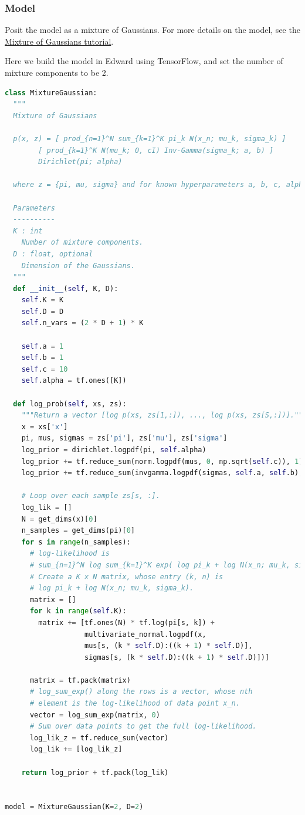 \subsubsection{Model}

Posit the model as a mixture of Gaussians. For more details on the
model, see the
\href{tut_mixture_gaussian.html}
{Mixture of Gaussians tutorial}.

Here we build the model in Edward using TensorFlow, and set the number
of mixture components to be 2.
\begin{lstlisting}[language=Python]
class MixtureGaussian:
  """
  Mixture of Gaussians

  p(x, z) = [ prod_{n=1}^N sum_{k=1}^K pi_k N(x_n; mu_k, sigma_k) ]
        [ prod_{k=1}^K N(mu_k; 0, cI) Inv-Gamma(sigma_k; a, b) ]
        Dirichlet(pi; alpha)

  where z = {pi, mu, sigma} and for known hyperparameters a, b, c, alpha.

  Parameters
  ----------
  K : int
    Number of mixture components.
  D : float, optional
    Dimension of the Gaussians.
  """
  def __init__(self, K, D):
    self.K = K
    self.D = D
    self.n_vars = (2 * D + 1) * K

    self.a = 1
    self.b = 1
    self.c = 10
    self.alpha = tf.ones([K])

  def log_prob(self, xs, zs):
    """Return a vector [log p(xs, zs[1,:]), ..., log p(xs, zs[S,:])]."""
    x = xs['x']
    pi, mus, sigmas = zs['pi'], zs['mu'], zs['sigma']
    log_prior = dirichlet.logpdf(pi, self.alpha)
    log_prior += tf.reduce_sum(norm.logpdf(mus, 0, np.sqrt(self.c)), 1)
    log_prior += tf.reduce_sum(invgamma.logpdf(sigmas, self.a, self.b), 1)

    # Loop over each sample zs[s, :].
    log_lik = []
    N = get_dims(x)[0]
    n_samples = get_dims(pi)[0]
    for s in range(n_samples):
      # log-likelihood is
      # sum_{n=1}^N log sum_{k=1}^K exp( log pi_k + log N(x_n; mu_k, sigma_k) )
      # Create a K x N matrix, whose entry (k, n) is
      # log pi_k + log N(x_n; mu_k, sigma_k).
      matrix = []
      for k in range(self.K):
        matrix += [tf.ones(N) * tf.log(pi[s, k]) +
                   multivariate_normal.logpdf(x,
                   mus[s, (k * self.D):((k + 1) * self.D)],
                   sigmas[s, (k * self.D):((k + 1) * self.D)])]

      matrix = tf.pack(matrix)
      # log_sum_exp() along the rows is a vector, whose nth
      # element is the log-likelihood of data point x_n.
      vector = log_sum_exp(matrix, 0)
      # Sum over data points to get the full log-likelihood.
      log_lik_z = tf.reduce_sum(vector)
      log_lik += [log_lik_z]

    return log_prior + tf.pack(log_lik)


model = MixtureGaussian(K=2, D=2)
\end{lstlisting}


